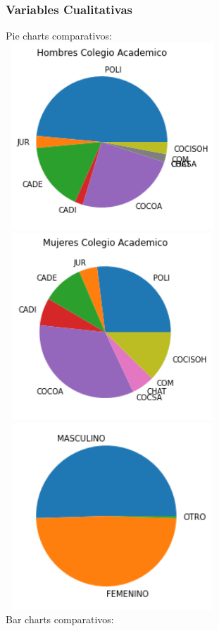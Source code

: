 \documentclass{article}
\begin{document}
\subsubsection*{Variables Cualitativas}
Pie charts comparativos:\\
\includegraphics[width=8cm, height=7cm]{Colegio_hombres}
\includegraphics[width=8cm, height=7cm]{Colegio_mujeres}
\includegraphics[width=8cm, height=7cm]{Pie_sexo}\vspace{1cm}\\
Bar charts comparativos:\\
\end{document}
